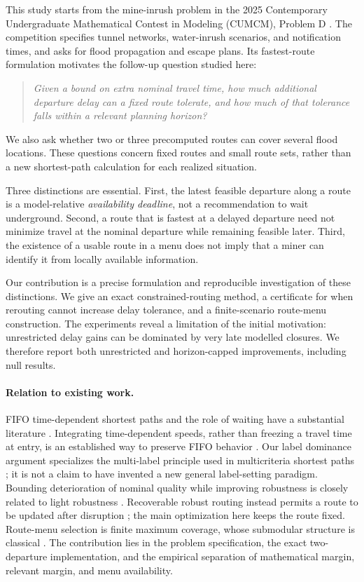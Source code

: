 \documentclass[11pt]{article}
\begin{document}
This study starts from the mine-inrush problem in the 2025 Contemporary Undergraduate Mathematical Contest in Modeling (CUMCM), Problem D \cite{cumcm}. The competition specifies tunnel networks, water-inrush scenarios, and notification times, and asks for flood propagation and escape plans. Its fastest-route formulation motivates the follow-up question studied here:
\begin{quote}
\emph{Given a bound on extra nominal travel time, how much additional departure delay can a fixed route tolerate, and how much of that tolerance falls within a relevant planning horizon?}
\end{quote}
We also ask whether two or three precomputed routes can cover several flood locations. These questions concern fixed routes and small route sets, rather than a new shortest-path calculation for each realized situation.

Three distinctions are essential. First, the latest feasible departure along a route is a model-relative \emph{availability deadline}, not a recommendation to wait underground. Second, a route that is fastest at a delayed departure need not minimize travel at the nominal departure while remaining feasible later. Third, the existence of a usable route in a menu does not imply that a miner can identify it from locally available information.

Our contribution is a precise formulation and reproducible investigation of these distinctions. We give an exact constrained-routing method, a certificate for when rerouting cannot increase delay tolerance, and a finite-scenario route-menu construction. The experiments reveal a limitation of the initial motivation: unrestricted delay gains can be dominated by very late modelled closures. We therefore report both unrestricted and horizon-capped improvements, including null results.

\paragraph{Relation to existing work.}
FIFO time-dependent shortest paths and the role of waiting have a substantial literature \cite{dean,orda}. Integrating time-dependent speeds, rather than freezing a travel time at entry, is an established way to preserve FIFO behavior \cite{ichoua}. Our label dominance argument specializes the multi-label principle used in multicriteria shortest paths \cite{martins}; it is not a claim to have invented a new general label-setting paradigm. Bounding deterioration of nominal quality while improving robustness is closely related to light robustness \cite{fischetti}. Recoverable robust routing instead permits a route to be updated after disruption \cite{goerigk}; the main optimization here keeps the route fixed. Route-menu selection is finite maximum coverage, whose submodular structure is classical \cite{nemhauser}. The contribution lies in the problem specification, the exact two-departure implementation, and the empirical separation of mathematical margin, relevant margin, and menu availability.
\end{document}
